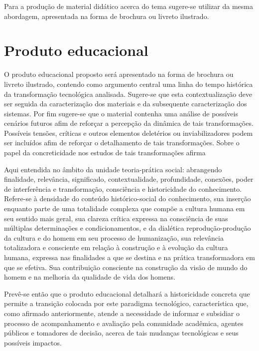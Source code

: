 \documentclass[
   article,       %
   12pt,          %
   oneside,       %
   a4paper,       %
   english,       %
   brazil,           %
   sumario=tradicional
   ]{abntex2}
\begin{document}
Para a produção de material didático acerca do tema sugere-se utilizar da mesma abordagem, apresentada na forma de brochura ou livreto ilustrado.




\section{Produto educacional}


O produto educacional proposto será apresentado na forma de brochura ou livreto ilustrado, contendo como argumento central uma linha do tempo histórica da transformação tecnológica analisada. Sugere-se que esta contextualização deve ser seguida da caracterização dos materiais e da subsequente caracterização dos sistemas. Por fim sugere-se que o material contenha uma análise de possíveis cenários futuros afim de reforçar a percepção da dinâmica de tais transformações. Possíveis tensões, críticas e outros elementos deletérios ou inviabilizadores podem ser incluídos afim de reforçar o detalhamento de tais transformações. Sobre o papel da concreticidade nos estudos de tais transformações afirma \cite[p. 56-57]{ANTONIO_CARLOS_HIDALGO}



\begin{citacao}

Aqui entendida no âmbito da unidade teoria-prática social: abrangendo finalidade,
relevância, significado, contextualidade, profundidade, conexões, poder de interferência e
transformação, consciência e historicidade do conhecimento. Refere-se à densidade do
conteúdo histórico-social do conhecimento, sua inserção enquanto parte de uma totalidade
complexa que compõe a cultura humana em seu sentido mais geral, sua clareza crítica
expressa na consciência de suas múltiplas determinações e condicionamentos, e da dialética
reprodução-produção da cultura e do homem em seu processo de humanização, sua relevância
totalizadora e consciente em relação à construção e à evolução da cultura humana, expressa
nas finalidades a que se destina e na prática transformadora em que se efetiva. Sua
contribuição consciente na construção da visão de mundo do homem e na melhoria da
qualidade de vida dos homens.
\end{citacao}



Prevê-se então que o produto educacional detalhará a historicidade concreta que permite a transição colocada por este paradigma tecnológico, característica que, como afirmado anteriormente, atende a necessidade de informar e subsidiar o processo de acompanhamento e avaliação pela comunidade acadêmica, agentes públicos e tomadores de decisão, acerca de tais mudanças tecnológicas e seus possíveis impactos.
\end{document}
